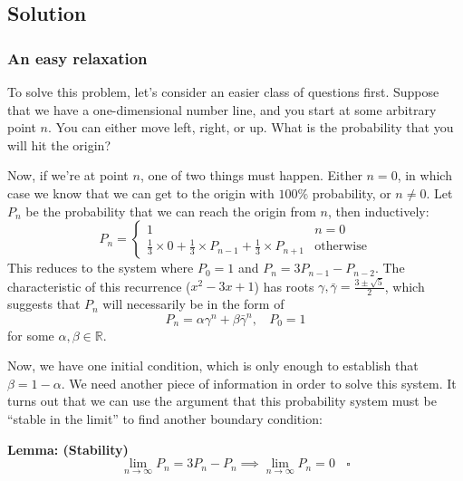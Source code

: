 \subsection*{Solution}

\subsubsection*{An easy relaxation}

To solve this problem, let's consider an easier class of questions first. Suppose that we have a one-dimensional number line, and you start at some arbitrary point $n$. You can either move left, right, or up. What is the probability that you will hit the origin?

Now, if we're at point $n$, one of two things must happen. Either $n = 0$, in which case we know that we can get to the origin with $100\%$ probability, or $n \ne 0$. Let $P_n$ be the probability that we can reach the origin from $n$, then inductively:
$$
P_n = \begin{cases}
1 & n = 0 \\
\frac13 \times 0 + \frac13 \times P_{n-1} + \frac13 \times P_{n+1} & \text{otherwise}
\end{cases}
$$
This reduces to the system where $P_0 = 1$ and $P_n = 3P_{n-1} - P_{n-2}$. The characteristic of this recurrence ($x^2 - 3x + 1$) has roots $\gamma,\bar\gamma = \frac{3 \pm \sqrt5}{2}$, which suggests that $P_n$ will necessarily be in the form of
$$
P_n = \alpha \gamma^n + \beta \bar\gamma^n, ~~~~ P_0 = 1
$$
for some $\alpha, \beta \in \mathbb{R}$.

Now, we have one initial condition, which is only enough to establish that $\beta = 1 - \alpha$. We need another piece of information in order to solve this system. It turns out that we can use the argument that this probability system must be ``stable in the limit'' to find another boundary condition:

\textbf{Lemma: (Stability)}$$
\lim_{n\to\infty} P_n = 3P_n - P_n \implies \lim_{n\to\infty} P_n = 0 ~~~~ \square
$$

